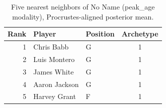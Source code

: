 \begin{table}[htbp]
  \centering\small
  \begin{tabular}{rllc}
    \toprule
    Rank & Player & Position & Archetype \\
    \midrule
    1 & Chris Babb & G & 1 \\
    2 & Luis Montero & G & 1 \\
    3 & James White & G & 1 \\
    4 & Aaron Jackson & G & 1 \\
    5 & Harvey Grant & F & 1 \\
    \bottomrule
  \end{tabular}
  \caption{Five nearest neighbors of No Name (peak_age modality), Procrustes-aligned posterior mean.}
  \label{tab:No_Name_neighbors_peak_age}
\end{table}

